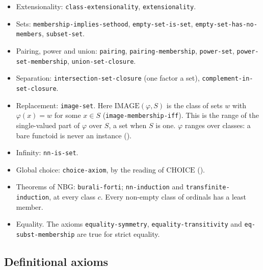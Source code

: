 \begin{itemize}
\item Extensionality: \texttt{class-extensionality},
  \texttt{extensionality}.
\item Sets: \texttt{membership-implies-sethood},
  \texttt{empty-set-is-set}, \texttt{empty-set-has-no-members},
  \texttt{subset-set}.
\item Pairing, power and union: \texttt{pairing},
  \texttt{pairing-membership}, \texttt{power-set},
  \texttt{power-set-membership}, \texttt{union-set-closure}.
\item Separation: \texttt{intersection-set-closure} (one factor a set),
  \texttt{complement-in-set-closure}.
\item Replacement: \texttt{image-set}.  Here $\mathrm{IMAGE}(\varphi, S)$
  is the class of sets $w$ with $\varphi(x)=w$ for some $x\in S$
  (\texttt{image-membership-iff}).  This is the range of the
  single-valued part of $\varphi$ over $S$, a set when $S$ is one.
  $\varphi$ ranges over classes: a bare functoid is never an instance
  ().
\item Infinity: \texttt{nn-is-set}.
\item Global choice: \texttt{choice-axiom}, by the reading of
  $\mathrm{CHOICE}$ ().
\item Theorems of NBG: \texttt{burali-forti}; \texttt{nn-induction} and
  \texttt{transfinite-induction}, at every class $c$.  Every non-empty
  class of ordinals has a least member.
\item Equality.  The axioms \texttt{equality-symmetry},
  \texttt{equality-transitivity} and \texttt{eq-subst-membership} are
  true for strict equality.
\end{itemize}

\subsection{Definitional axioms}

